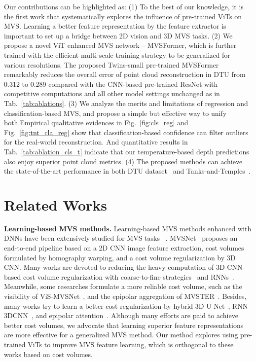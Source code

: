 \documentclass[10pt]{article} \usepackage[preprint]{tmlr}
\begin{document}
Our contributions can be highlighted as: (1) To the best of our knowledge, it is the first work that systematically explores the influence of pre-trained ViTs on MVS. Learning a better feature representation by the feature extractor is important to set up a bridge between 2D vision and 3D MVS tasks. (2) We propose a novel ViT enhanced MVS network -- MVSFormer, which is further trained with the efficient multi-scale training strategy to be generalized for various resolutions. The proposed Twins-small pre-trained MVSFormer remarkably reduces the overall error of point cloud reconstruction in DTU from 0.312 to 0.289 compared with the CNN-based pre-trained ResNet with competitive computations and all other model settings unchanged as in Tab.~\ref{tab:ablations}.
(3) We analyze the merits and limitations of regression and classification-based MVS, and propose a simple but effective way to unify both.Empirical qualitative evidences in Fig.~\ref{fig:cls_reg} and Fig.~\ref{fig:tnt_cla_reg} show that classification-based confidence can filter outliers for the real-world reconstruction. And quantitative results in Tab.~\ref{tab:ablation_cls_t} indicate that our temperature-based depth predictions also enjoy superior point cloud metrics. (4) The proposed methods can achieve the state-of-the-art performance in both DTU dataset~\citep{aanaes2016large} and Tanks-and-Temples~\citep{Knapitsch2017}.

\section{Related Works}

\noindent\textbf{Learning-based MVS methods.} 
Learning-based MVS methods enhanced with DNNs have been extensively studied for MVS tasks~\citep{ji2017surfacenet} .
MVSNet~\citep{yao2018mvsnet} proposes an end-to-end pipeline based on a 2D CNN image feature extraction, cost volumes formulated by homography warping, and a cost volume regularization by 3D CNN.
Many works are devoted to reducing the heavy computation of 3D CNN-based cost volume regularization with coarse-to-fine strategies~\citep{gu2020cascade,yang2020cost,mi2021generalized} and RNNs~\citep{yao2019recurrent,wei2021aa,wei2022bidirectional}. 
Meanwhile, some researches formulate a more reliable cost volume, such as the visibility of ViS-MVSNet~\citep{zhang2020visibility}, and the epipolar aggregation of MVSTER~\citep{wang2022mvster}.
Besides, many works try to learn a better cost regularization by hybrid 3D U-Net~\citep{luo2019p,sormann2020bp}, RNN-3DCNN~\citep{wei2021aa}, and epipolar attention~\citep{ma2021epp,yang2021mvs2d}.
Although many efforts are paid to achieve better cost volumes, we advocate that learning superior feature representations are more effective for a generalized MVS method. Our method explores using pre-trained ViTs to improve  MVS feature learning, which is orthogonal to these works based on cost volumes.
\end{document}
